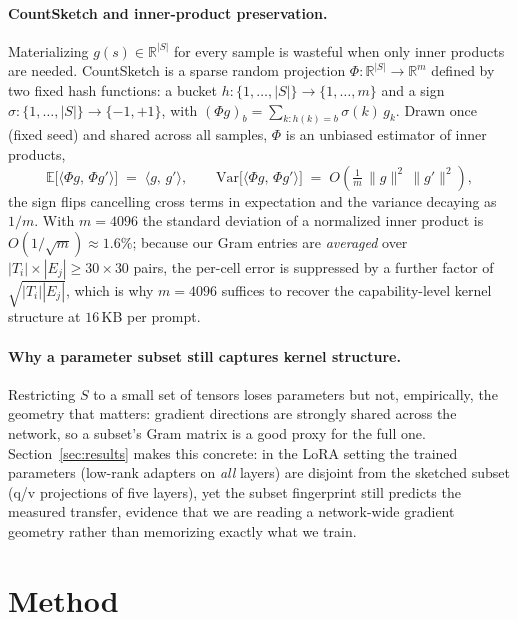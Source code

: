 \documentclass{article} %
\begin{document}
\paragraph{CountSketch and inner-product preservation.}
Materializing $g(s)\in\mathbb{R}^{|S|}$ for every sample is wasteful when only inner products
are needed. CountSketch \citep{charikar2002countsketch} is a sparse random projection
$\Phi:\mathbb{R}^{|S|}\to\mathbb{R}^{m}$ defined by two fixed hash functions: a bucket
$h:\{1,\dots,|S|\}\to\{1,\dots,m\}$ and a sign $\sigma:\{1,\dots,|S|\}\to\{-1,+1\}$, with
$(\Phi g)_b = \sum_{k:h(k)=b}\sigma(k)\,g_k$. Drawn once (fixed seed) and shared across all
samples, $\Phi$ is an unbiased estimator of inner products,
\begin{equation}
  \mathbb{E}\big[\langle \Phi g,\, \Phi g'\rangle\big] \;=\; \langle g,\, g'\rangle,
  \qquad
  \mathrm{Var}\big[\langle \Phi g,\, \Phi g'\rangle\big] \;=\; O\!\left(\tfrac{1}{m}\,\|g\|^2\,\|g'\|^2\right),
  \label{eq:countsketch}
\end{equation}
the sign flips cancelling cross terms in expectation and the variance decaying as $1/m$. With
$m=4096$ the standard deviation of a normalized inner product is $O(1/\sqrt{m})\approx 1.6\%$;
because our Gram entries are \emph{averaged} over $|T_i|\times|E_j| \ge 30\times 30$ pairs, the
per-cell error is suppressed by a further factor of $\sqrt{|T_i||E_j|}$, which is why $m=4096$
suffices to recover the capability-level kernel structure at $16$\,KB per prompt.

\paragraph{Why a parameter subset still captures kernel structure.}
Restricting $S$ to a small set of tensors loses parameters but not, empirically, the geometry
that matters: gradient directions are strongly shared across the network, so a subset's Gram
matrix is a good proxy for the full one. Section~\ref{sec:results} makes this concrete: in the
LoRA setting the trained parameters (low-rank adapters on \emph{all} layers) are disjoint from
the sketched subset (q/v projections of five layers), yet the subset fingerprint still predicts
the measured transfer, evidence that we are reading a network-wide gradient geometry rather than
memorizing exactly what we train.

\section{Method}
\label{sec:method}
\end{document}
